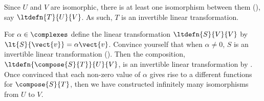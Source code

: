 Since $U$ and $V$ are isomorphic, there is at least one isomorphism between them (), say $\ltdefn{T}{U}{V}$.  As such, $T$ is an invertible linear transformation.\par
%
For $\alpha\in\complexes$ define the linear transformation $\ltdefn{S}{V}{V}$ by $\lt{S}{\vect{v}}=\alpha\vect{v}$.  Convince yourself that when $\alpha\neq 0$, $S$ is an invertible linear transformation ().  Then the composition, $\ltdefn{\compose{S}{T}}{U}{V}$, is an invertible linear transformation by .  Once convinced that each non-zero value of $\alpha$ gives rise to a different functions for $\compose{S}{T}$, then we have constructed infinitely many isomorphisms from $U$ to $V$.